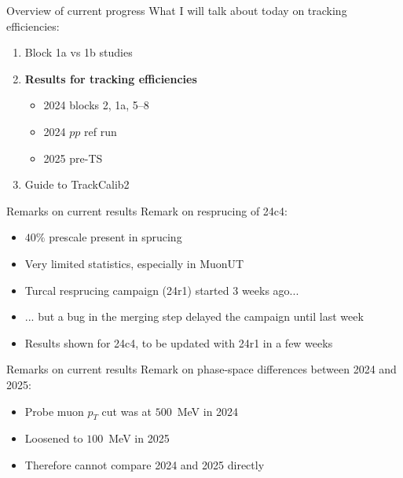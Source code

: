 \documentclass[xcolor={dvipsnames}]{beamer}
\begin{document}
\begin{frame}{Overview of current progress}
  \vspace{0.0cm}
  {\large What I will talk about today on tracking efficiencies:}
  \vspace{0.2cm}
  \begin{enumerate}
    \setlength\itemsep{1.0em}
    \item{Block 1a vs 1b studies}
    \item{\textbf{Results for tracking efficiencies}}
    \begin{itemize}
      \item{2024 blocks 2, 1a, 5--8}
      \item{2024 $pp$ ref run}
      \item{2025 pre-TS}
    \end{itemize}
    \item{Guide to TrackCalib2}
  \end{enumerate}
\end{frame}

\begin{frame}{Remarks on current results}
  \vspace{0.0cm}
  {\large Remark on resprucing of 24c4:}
  \vspace{0.2cm}
  \begin{itemize}
    \setlength\itemsep{1.0em}
    \item{$40\%$ prescale present in sprucing}
    \item{Very limited statistics, especially in MuonUT}
    \item{Turcal resprucing campaign (24r1) started 3 weeks ago...}
    \item{... but a bug in the merging step delayed the campaign until last week}
    \item{Results shown for 24c4, to be updated with 24r1 in a few weeks}
  \end{itemize}
\end{frame}

\begin{frame}{Remarks on current results}
  \vspace{0.0cm}
  {\large Remark on phase-space differences between 2024 and 2025:}
  \vspace{0.2cm}
  \begin{itemize}
    \setlength\itemsep{1.0em}
    \item{Probe muon $p_T$ cut was at $500$~MeV in 2024}
    \item{Loosened to $100$~MeV in 2025}
    \item{Therefore cannot compare 2024 and 2025 directly}
  \end{itemize}
\end{frame}
\end{document}
